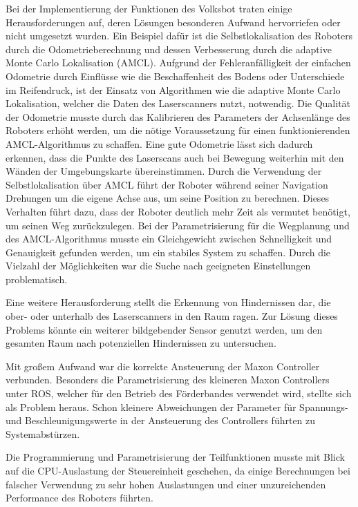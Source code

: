 Bei der Implementierung der Funktionen des Volksbot traten einige Herausforderungen auf, deren Lösungen besonderen Aufwand hervorriefen oder nicht umgesetzt wurden. Ein Beispiel dafür ist die Selbstlokalisation des Roboters durch die Odometrieberechnung und dessen Verbesserung durch die adaptive Monte Carlo Lokalisation (AMCL). Aufgrund der Fehleranfälligkeit der einfachen Odometrie durch Einflüsse wie die Beschaffenheit des Bodens oder Unterschiede im Reifendruck, ist der Einsatz von Algorithmen wie die adaptive Monte Carlo Lokalisation, welcher die Daten des Laserscanners nutzt, notwendig.  Die Qualität der Odometrie musste durch das Kalibrieren des Parameters der Achsenlänge des Roboters erhöht werden, um die nötige Voraussetzung für einen funktionierenden AMCL-Algorithmus zu schaffen. Eine gute Odometrie lässt sich dadurch erkennen, dass die Punkte des Laserscans auch bei Bewegung weiterhin mit den Wänden der Umgebungskarte übereinstimmen. Durch die Verwendung der Selbstlokalisation über AMCL führt der Roboter während seiner Navigation Drehungen um die eigene Achse aus, um seine Position zu berechnen. Dieses Verhalten führt dazu, dass der Roboter deutlich mehr Zeit als vermutet benötigt, um seinen Weg zurückzulegen. Bei der Parametrisierung für die Wegplanung und des AMCL-Algorithmus musste ein Gleichgewicht zwischen Schnelligkeit und Genauigkeit gefunden werden, um ein stabiles System zu schaffen. Durch die Vielzahl der Möglichkeiten war die Suche nach geeigneten Einstellungen problematisch.  

Eine weitere Herausforderung stellt die Erkennung von Hindernissen dar, die ober- oder unterhalb des Laserscanners in den Raum ragen. Zur Lösung dieses Problems könnte ein weiterer bildgebender Sensor genutzt werden, um den gesamten Raum nach potenziellen Hindernissen zu untersuchen.

Mit großem Aufwand war die korrekte Ansteuerung der Maxon Controller verbunden. Besonders die Parametrisierung des kleineren Maxon Controllers unter ROS, welcher für den Betrieb des Förderbandes verwendet wird, stellte sich als Problem heraus. Schon kleinere Abweichungen der Parameter für Spannungs- und Beschleunigungswerte in der Ansteuerung des Controllers führten zu Systemabstürzen.
 
Die Programmierung und Parametrisierung der Teilfunktionen musste mit Blick auf
die CPU-Auslastung der Steuereinheit geschehen, da einige Berechnungen bei falscher
Verwendung zu sehr hohen Auslastungen und einer unzureichenden Performance des
Roboters führten.



